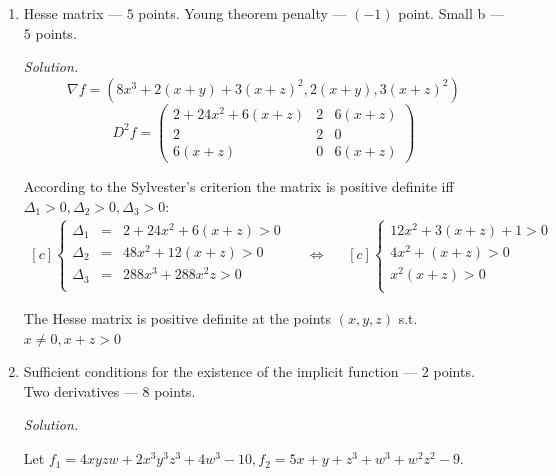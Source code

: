 \documentclass[12pt]{article} %
\theoremstyle{definition} %
\begin{document}
\begin{enumerate}
\item Hesse matrix --- $5$ points. Young theorem penalty --- $(-1)$ point. Small b --- $5$ points.

\textit{Solution.}
\begin{equation*}
\nabla f = \left(8 x^3+2 (x+y)+3 (x+z)^2,2 (x+y),3 (x+z)^2\right)
\end{equation*}
\begin{equation*}
D^2f =\left(
\begin{array}{ccc}
 2+24 x^2+6 (x+z) & 2 & 6 (x+z) \\
 2 & 2 & 0 \\
 6 (x+z) & 0 & 6 (x+z)
\end{array}
\right)
\end{equation*}

According to the Sylvester's criterion the matrix is positive definite iff $\Delta_1>0, \Delta_2>0, \Delta_3>0$:
\begin{equation*}
\begin{aligned}[c]
\left\{
\begin{array}{ccl}
\Delta_1 &=& 2+24 x^2+6 (x+z) >0\\
\Delta_2 &=& 48 x^2+12(x+z)>0\\
\Delta_3 &=&288 x^3+288 x^2 z>0\\
\end{array}
\right.
\end{aligned}
\quad\Longleftrightarrow\quad
\begin{aligned}[c]
\left\{
\begin{array}{l}
 12x^2+3 (x+z) +1>0\\
4x^2+(x+z)>0\\
x^2(x+z)>0\\
\end{array}
\right.
\end{aligned}
\end{equation*}

The Hesse matrix is positive definite at the points $(x,y,z)$ s.t. $x\neq0, x+z>0$


\item Sufficient conditions for the existence of the implicit function --- $2$ points. Two derivatives --- $8$ points.

\textit{Solution.}

Let $f_1 = 4x y z w+2x^3 y^3 z^3+4w^3-10, f_2=5 x+y+z^3+w^3+w^2 z^2-9$.


\end{enumerate}
\end{document}
